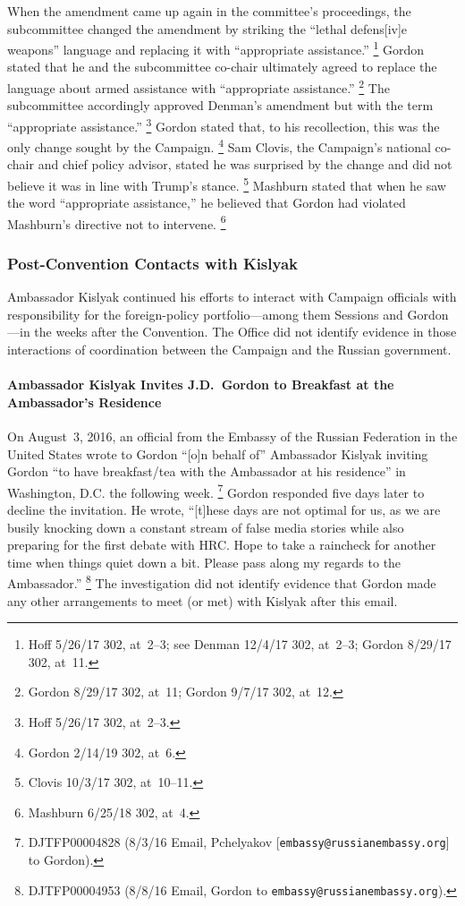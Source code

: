 When the amendment came up again in the committee's proceedings, the subcommittee changed the amendment by striking the ``lethal defens[iv]e weapons'' language and replacing it with ``appropriate assistance.''%
\footnote{Hoff 5/26/17 302, at~2--3;
see Denman 12/4/17 302, at~2--3;
Gordon 8/29/17 302, at~11.}
Gordon stated that he and the subcommittee co-chair ultimately agreed to replace the language about armed assistance with ``appropriate assistance.''%
\footnote{Gordon 8/29/17 302, at~11;
Gordon 9/7/17 302, at~12.}
The subcommittee accordingly approved Denman's amendment but with the term ``appropriate assistance.''%
\footnote{Hoff 5/26/17 302, at~2--3.}
Gordon stated that, to his recollection, this was the only change sought by the Campaign.%
\footnote{Gordon 2/14/19 302, at~6.}
Sam Clovis, the Campaign's national co-chair and chief policy advisor, stated he was surprised by the change and did not believe it was in line with Trump's stance.%
\footnote{Clovis 10/3/17 302, at~10--11.}
Mashburn stated that when he saw the word ``appropriate assistance,'' he believed that Gordon had violated Mashburn's directive not to intervene.%
\footnote{Mashburn 6/25/18 302, at~4.}

\subsubsection{Post-Convention Contacts with Kislyak}

Ambassador Kislyak continued his efforts to interact with Campaign officials with responsibility for the foreign-policy portfolio---among them Sessions and Gordon---in the weeks after the Convention.
The Office did not identify evidence in those interactions of coordination between the Campaign and the Russian government.

\paragraph{Ambassador Kislyak Invites J.D.~Gordon to Breakfast at the Ambassador's Residence}

On August~3, 2016, an official from the Embassy of the Russian Federation in the United States wrote to Gordon ``[o]n behalf of\thinspace'' Ambassador Kislyak inviting Gordon ``to have breakfast/tea with the Ambassador at his residence'' in Washington, D.C. the following week.%
\footnote{DJTFP00004828 (8/3/16 Email, Pchelyakov [\verb+embassy@russianembassy.org+] to Gordon).}
Gordon responded five days later to decline the invitation.
He wrote, ``[t]hese days are not optimal for us, as we are busily knocking down a constant stream of false media stories while also preparing for the first debate with HRC\null.
Hope to take a raincheck for another time when things quiet down a bit.
Please pass along my regards to the Ambassador.''%
\footnote{DJTFP00004953 (8/8/16 Email, Gordon to \verb+embassy@russianembassy.org+).}
The investigation did not identify evidence that Gordon made any other arrangements to meet (or met) with Kislyak after this email.

